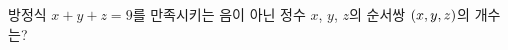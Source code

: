 방정식 $x+y+z=9$를 만족시키는 음이 아닌 정수 $x$, $y$, $z$의 순서쌍 $(x{,}\mkern3mu\mathopen{}y{,}\mkern3mu\mathopen{}z)$의 개수는?
